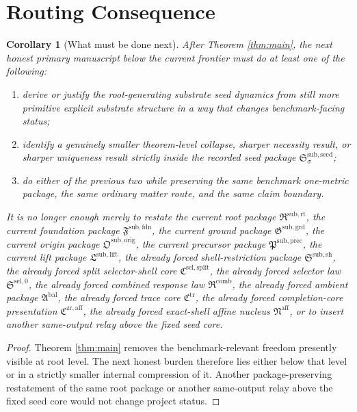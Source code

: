 \documentclass[11pt]{article}
\newcommand{\FoundationPackage}{\mathfrak F^{\mathrm{sub,fdn}}}
\newcommand{\GroundPackage}{\mathfrak G^{\mathrm{sub,grd}}}
\newcommand{\OriginPackage}{\mathfrak O^{\mathrm{sub,orig}}}
\newcommand{\PrecursorPackage}{\mathfrak P^{\mathrm{sub,prec}}}
\newcommand{\LiftPackage}{\mathfrak L^{\mathrm{sub,lift}}}
\newcommand{\ShellRestriction}{\mathfrak S^{\mathrm{sub,sh}}}
\newcommand{\SelectorCore}{\mathfrak C^{\mathrm{sel,split}}}
\newcommand{\SelectorLaw}{\mathfrak S^{\mathrm{sel},0}}
\newcommand{\CombinedLaw}{\mathfrak R^{\mathrm{comb}}}
\newcommand{\AmbientPackage}{\mathfrak A^{\mathrm{bal}}}
\newcommand{\TraceCore}{\mathfrak C^{\mathrm{tr}}}
\newcommand{\CompletionCore}{\mathfrak C^{\mathrm{zr,aff}}}
\newcommand{\AffineNucleus}{\mathfrak N^{\mathrm{aff}}}
\newcommand{\RootPackage}{\mathfrak R^{\mathrm{sub,rt}}}
\newcommand{\SeedPackage}{\mathfrak S^{\mathrm{sub,seed}}}
\newtheorem{corollary}{Corollary}
\begin{document}
\section{Routing Consequence}

\begin{corollary}[What must be done next]
\label{cor:next}
After Theorem \ref{thm:main}, the next honest primary manuscript below the current frontier must do at least one of the following:
\begin{enumerate}
    \item derive or justify the root-generating substrate seed dynamics from still more primitive explicit substrate structure in a way that changes benchmark-facing status;
    \item identify a genuinely smaller theorem-level collapse, sharper necessity result, or sharper uniqueness result strictly inside the recorded seed package \(\SeedPackage_{\sigma}\);
    \item do either of the previous two while preserving the same benchmark one-metric package, the same ordinary matter route, and the same claim boundary.
\end{enumerate}
It is no longer enough merely to restate the current root package \(\RootPackage\), the current foundation package \(\FoundationPackage\), the current ground package \(\GroundPackage\), the current origin package \(\OriginPackage\), the current precursor package \(\PrecursorPackage\), the current lift package \(\LiftPackage\), the already forced shell-restriction package \(\ShellRestriction\), the already forced split selector-shell core \(\SelectorCore\), the already forced selector law \(\SelectorLaw\), the already forced combined response law \(\CombinedLaw\), the already forced ambient package \(\AmbientPackage\), the already forced trace core \(\TraceCore\), the already forced completion-core presentation \(\CompletionCore\), the already forced exact-shell affine nucleus \(\AffineNucleus\), or to insert another same-output relay above the fixed seed core.
\end{corollary}

\begin{proof}
Theorem \ref{thm:main} removes the benchmark-relevant freedom presently visible at root level. The next honest burden therefore lies either below that level or in a strictly smaller internal compression of it. Another package-preserving restatement of the same root package or another same-output relay above the fixed seed core would not change project status.
\end{proof}
\end{document}
